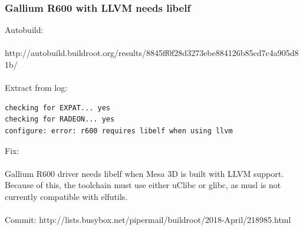 \documentclass[12pt,a4paper,oneside]{article}
\begin{document}
\subsubsection*{Gallium R600 with LLVM needs libelf}
Autobuild:\\\\
http://autobuild.buildroot.org/results/8845ff0f28d3273ebe884126b85cd7c4a905d81b/\\\\
Extract from log:
\begin{lstlisting}[language=sh,keywords={}]
checking for EXPAT... yes
checking for RADEON... yes
configure: error: r600 requires libelf when using llvm
\end{lstlisting}
Fix:\\\\
Gallium R600 driver needs libelf when Mesa 3D is built with LLVM support. Because
of this, the toolchain must use either uClibc or glibc, as musl is not currently
compatible with elfutils.\\\\
Commit: http://lists.busybox.net/pipermail/buildroot/2018-April/218985.html
\newpage
\end{document}
